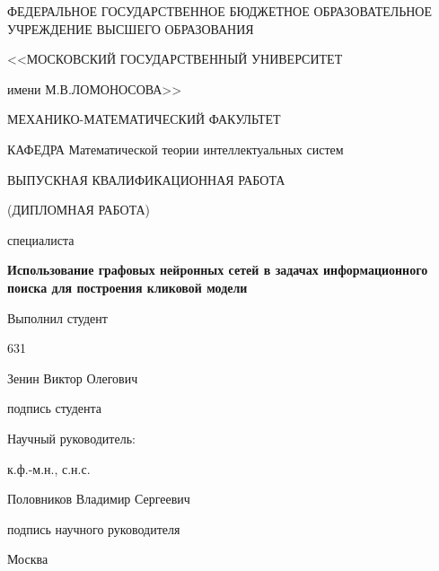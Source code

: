 \begin{titlepage}
  \begin{center}
    ФЕДЕРАЛЬНОЕ ГОСУДАРСТВЕННОЕ БЮДЖЕТНОЕ ОБРАЗОВАТЕЛЬНОЕ УЧРЕЖДЕНИЕ ВЫСШЕГО ОБРАЗОВАНИЯ

    <<МОСКОВСКИЙ ГОСУДАРСТВЕННЫЙ УНИВЕРСИТЕТ

    имени М.В.ЛОМОНОСОВА>>

    \vspace{0.7cm}

    МЕХАНИКО-МАТЕМАТИЧЕСКИЙ ФАКУЛЬТЕТ

    \vspace{0.7cm}

    КАФЕДРА Математической теории интеллектуальных систем 

    \vspace{3cm}

    ВЫПУСКНАЯ КВАЛИФИКАЦИОННАЯ РАБОТА
  
    (ДИПЛОМНАЯ РАБОТА)
  
    специалиста

    \vspace{0.7cm}

    \textbf{Использование графовых нейронных сетей в задачах информационного поиска для построения кликовой модели}

  \end{center}

  \vspace{2cm}

  \hfill
  \begin{minipage}{0.5\textwidth}
    Выполнил студент

    631

    Зенин Виктор Олегович

    \vspace{1cm}

    \underline{\hspace{4cm}}

    подпись студента

    \vspace{0.5cm}

    Научный руководитель:

    к.ф.-м.н., с.н.с.

    Половников Владимир Сергеевич

    \vspace{1cm}

    \underline{\hspace{4cm}}

    подпись научного руководителя
 \end{minipage}

  \vfill

  \begin{center}
    \large Москва

    \the\year
  \end{center}

\end{titlepage}
